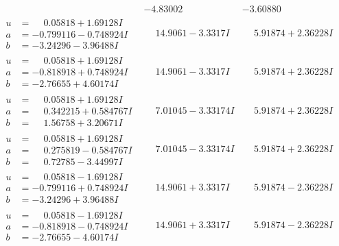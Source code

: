 \documentclass[1p]{elsarticle_modified}
\theoremstyle{definition}
\begin{document}
$$\begin{array}{c|c|c}
 & -4.83002\phantom{ +0.000000I} & -3.60880\phantom{ +0.000000I} \\ \hline\begin{aligned}
u &= \phantom{-}0.05818 + 1.69128 I \\
a &= -0.799116 - 0.748924 I \\
b &= -3.24296 - 3.96488 I\end{aligned}
 & \phantom{-}14.9061 - 3.3317 I & \phantom{-}5.91874 + 2.36228 I \\ \hline\begin{aligned}
u &= \phantom{-}0.05818 + 1.69128 I \\
a &= -0.818918 + 0.748924 I \\
b &= -2.76655 + 4.60174 I\end{aligned}
 & \phantom{-}14.9061 - 3.3317 I & \phantom{-}5.91874 + 2.36228 I \\ \hline\begin{aligned}
u &= \phantom{-}0.05818 + 1.69128 I \\
a &= \phantom{-}0.342215 + 0.584767 I \\
b &= \phantom{-}1.56758 + 3.20671 I\end{aligned}
 & \phantom{-}7.01045 - 3.33174 I & \phantom{-}5.91874 + 2.36228 I \\ \hline\begin{aligned}
u &= \phantom{-}0.05818 + 1.69128 I \\
a &= \phantom{-}0.275819 - 0.584767 I \\
b &= \phantom{-}0.72785 - 3.44997 I\end{aligned}
 & \phantom{-}7.01045 - 3.33174 I & \phantom{-}5.91874 + 2.36228 I \\ \hline\begin{aligned}
u &= \phantom{-}0.05818 - 1.69128 I \\
a &= -0.799116 + 0.748924 I \\
b &= -3.24296 + 3.96488 I\end{aligned}
 & \phantom{-}14.9061 + 3.3317 I & \phantom{-}5.91874 - 2.36228 I \\ \hline\begin{aligned}
u &= \phantom{-}0.05818 - 1.69128 I \\
a &= -0.818918 - 0.748924 I \\
b &= -2.76655 - 4.60174 I\end{aligned}
 & \phantom{-}14.9061 + 3.3317 I & \phantom{-}5.91874 - 2.36228 I \\ \hline\begin{aligned}

\end{aligned}
\end{array}$$
\end{document}
